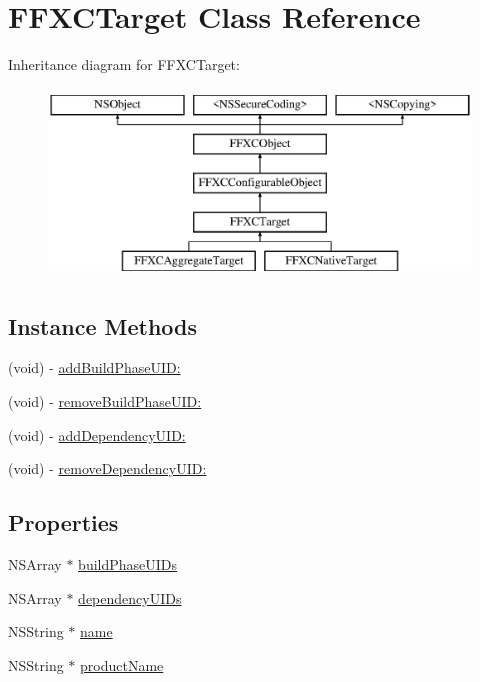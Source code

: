 \hypertarget{interface_f_f_x_c_target}{\section{F\-F\-X\-C\-Target Class Reference}
\label{interface_f_f_x_c_target}
}
Inheritance diagram for F\-F\-X\-C\-Target\-:\begin{figure}[H]
\begin{center}
\leavevmode
\includegraphics[height=5.000000cm]{interface_f_f_x_c_target}
\end{center}
\end{figure}
\subsection*{Instance Methods}
\begin{DoxyCompactItemize}
\item 
(void) -\/ \hyperlink{interface_f_f_x_c_target_aac7f6180aacfcc579157f31047c72eae}{add\-Build\-Phase\-U\-I\-D\-:}
\item 
(void) -\/ \hyperlink{interface_f_f_x_c_target_a6dc9555e9a0af3da49395bbddea0e03e}{remove\-Build\-Phase\-U\-I\-D\-:}
\item 
(void) -\/ \hyperlink{interface_f_f_x_c_target_ab6361eaf15608584bd7cf287d579ce76}{add\-Dependency\-U\-I\-D\-:}
\item 
(void) -\/ \hyperlink{interface_f_f_x_c_target_aabbdf12df0f26158985ea7022d41455a}{remove\-Dependency\-U\-I\-D\-:}
\end{DoxyCompactItemize}
\subsection*{Properties}
\begin{DoxyCompactItemize}
\item 
N\-S\-Array $\ast$ \hyperlink{interface_f_f_x_c_target_a7f5d03792ca63195a8c091b549068fd8}{build\-Phase\-U\-I\-Ds}
\item 
N\-S\-Array $\ast$ \hyperlink{interface_f_f_x_c_target_a97c24ff46843ece8531ee0d04a405563}{dependency\-U\-I\-Ds}
\item 
N\-S\-String $\ast$ \hyperlink{interface_f_f_x_c_target_a4b93d352d2fca75b34e1b5a50e03f587}{name}
\item 
N\-S\-String $\ast$ \hyperlink{interface_f_f_x_c_target_ae9a82bea4f5083505b36fa31e67e8498}{product\-Name}
\end{DoxyCompactItemize}


